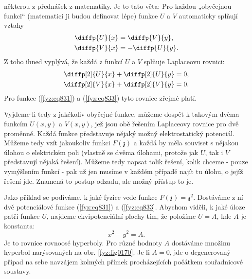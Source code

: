   některou z přednášek z matematiky. Je to tato věta: Pro každou „obyčejnou funkci“ (matematici ji
  budou definovat lépe) funkce \(U\) a \(V\) automaticky splňují vztahy
  \begin{subequations}\label{fyz:eq834}
    \begin{align}
      \diffp{U}{x} &=  \diffp{V}{y},       \label{fyz:eq834a}     \\
      \diffp{V}{x} &= -\diffp{U}{y}.       \label{fyz:eq834b}     
    \end{align}
  \end{subequations}
  Z toho ihned vyplývá, že každá z funkcí \(U\) a \(V\) splňuje Laplaceovu rovnici:
  \begin{subequations}\label{fyz:eq835}
    \begin{align}
      \diffp[2]{U}{x} + \diffp[2]{U}{y} &=0,       \label{fyz:eq835a}     \\
      \diffp[2]{V}{x} + \diffp[2]{V}{y} &=0.       \label{fyz:eq835b}     
    \end{align}
  \end{subequations}
  Pro funkce (\ref{fyz:eq831}) a (\ref{fyz:eq833}) tyto rovnice zřejmé platí.

  Vyjdeme-li tedy z jakékoliv obyčejné funkce, můžeme dospět k takovým dvěma funkcím \(U(x, y)\) a
  \(V(x, y)\), jež jsou obě řešením Laplaceovy rovnice pro dvě proměnné. Každá funkce představuje
  nějaký možný elektrostatický potenciál. Můžeme tedy vzít jakoukoliv funkci \(F(\mathfrak{z})\) a
  každá by měla souviset s nějakou úlohou o elektrickém poli (vlastně se dvěma úlohami, protože jak
  \(U\), tak i \(V\) představují nějaká řešení). Můžeme tedy napsat tolik řešení, kolik chceme -
  pouze vymýšlením funkcí - pak už jen musíme v každém případě najít tu úlohu, o jejíž řešení jde.
  Znamená to postup odzadu, ale možný přístup to je.

  Jako příklad se podíváme, k jaké fyzice vede funkce \(F(\mathfrak{z}) = \mathfrak{z}^2 \).
  Dostáváme z ní dvě potenciálové funkce (\ref{fyz:eq831}) a (\ref{fyz:eq833}. Abychom viděli, k
  jaké úloze patří funkce \(U\), najdeme ekvipotenciální plochy tím, že položíme \(U=A\), kde \(A\)
  je konstanta:
  \begin{equation*}
    x^2 - y^2 = A.
  \end{equation*}
  Je to rovnice rovnoosé hyperboly. Pro různé hodnoty \(A\) dostáváme množinu hyperbol narýsovaných
  na obr. \ref{fyz:fig0170}. Je-li \(A = 0\), jde o degenerovaný případ na sebe navzájem kolmých
  přímek procházejících počátkem souřadnicové soustavy.

